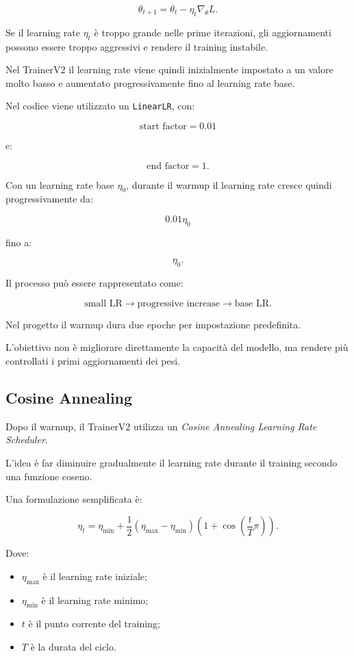 \[
\theta_{t+1}
=
\theta_t
-
\eta_t
\nabla_\theta L.
\]

Se il learning rate $\eta_t$ è troppo grande nelle prime iterazioni,
gli aggiornamenti possono essere troppo aggressivi e rendere il training
instabile.

Nel TrainerV2 il learning rate viene quindi inizialmente impostato a un valore
molto basso e aumentato progressivamente fino al learning rate base.

Nel codice viene utilizzato un \texttt{LinearLR}, con:

\[
\text{start factor}=0.01
\]

e:

\[
\text{end factor}=1.
\]

Con un learning rate base $\eta_0$, durante il warmup il learning rate cresce
quindi progressivamente da:

\[
0.01\eta_0
\]

fino a:

\[
\eta_0.
\]

Il processo può essere rappresentato come:

\[
\text{small LR}
\rightarrow
\text{progressive increase}
\rightarrow
\text{base LR}.
\]

Nel progetto il warmup dura due epoche per impostazione predefinita.

L'obiettivo non è migliorare direttamente la capacità del modello, ma rendere
più controllati i primi aggiornamenti dei pesi.

\subsection{Cosine Annealing}

Dopo il warmup, il TrainerV2 utilizza un
\textit{Cosine Annealing Learning Rate Scheduler}.

L'idea è far diminuire gradualmente il learning rate durante il training
secondo una funzione coseno.

Una formulazione semplificata è:

\[
\eta_t
=
\eta_{\min}
+
\frac{1}{2}
(\eta_{\max}-\eta_{\min})
\left(
1+\cos\left(
\frac{t}{T}\pi
\right)
\right).
\]

Dove:

\begin{itemize}
    \item $\eta_{\max}$ è il learning rate iniziale;
    \item $\eta_{\min}$ è il learning rate minimo;
    \item $t$ è il punto corrente del training;
    \item $T$ è la durata del ciclo.
\end{itemize}

